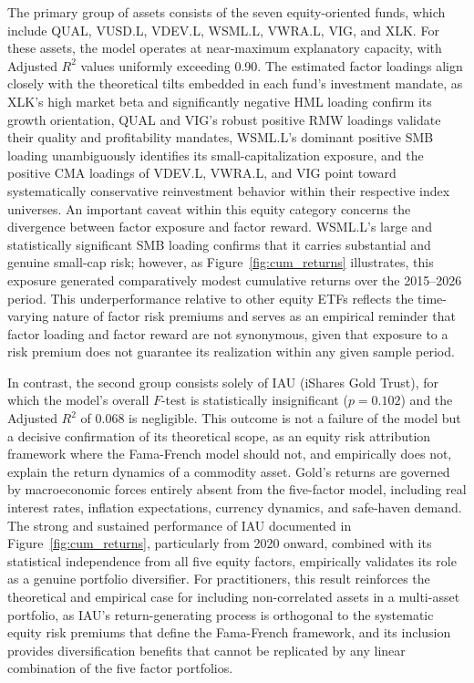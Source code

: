 \documentclass[12pt]{article}
\begin{document}
The primary group of assets consists of the seven equity-oriented funds, which include QUAL, VUSD.L, VDEV.L, WSML.L, VWRA.L, VIG, and XLK. For these assets, the model operates at near-maximum explanatory capacity, with Adjusted $R^2$ values uniformly exceeding 0.90. The estimated factor loadings align closely with the theoretical tilts embedded in each fund's investment mandate, as XLK's high market beta and significantly negative HML loading confirm its growth orientation, QUAL and VIG's robust positive RMW loadings validate their quality and profitability mandates, WSML.L's dominant positive SMB loading unambiguously identifies its small-capitalization exposure, and the positive CMA loadings of VDEV.L, VWRA.L, and VIG point toward systematically conservative reinvestment behavior within their respective index universes. An important caveat within this equity category concerns the divergence between factor exposure and factor reward. WSML.L's large and statistically significant SMB loading confirms that it carries substantial and genuine small-cap risk; however, as Figure~\ref{fig:cum_returns} illustrates, this exposure generated comparatively modest cumulative returns over the 2015--2026 period. This underperformance relative to other equity ETFs reflects the time-varying nature of factor risk premiums and serves as an empirical reminder that factor loading and factor reward are not synonymous, given that exposure to a risk premium does not guarantee its realization within any given sample period.

In contrast, the second group consists solely of IAU (iShares Gold Trust), for which the model's overall $F$-test is statistically insignificant ($p = 0.102$) and the Adjusted $R^2$ of 0.068 is negligible. This outcome is not a failure of the model but a decisive confirmation of its theoretical scope, as an equity risk attribution framework where the Fama-French model should not, and empirically does not, explain the return dynamics of a commodity asset. Gold's returns are governed by macroeconomic forces entirely absent from the five-factor model, including real interest rates, inflation expectations, currency dynamics, and safe-haven demand. The strong and sustained performance of IAU documented in Figure~\ref{fig:cum_returns}, particularly from 2020 onward, combined with its statistical independence from all five equity factors, empirically validates its role as a genuine portfolio diversifier. For practitioners, this result reinforces the theoretical and empirical case for including non-correlated assets in a multi-asset portfolio, as IAU's return-generating process is orthogonal to the systematic equity risk premiums that define the Fama-French framework, and its inclusion provides diversification benefits that cannot be replicated by any linear combination of the five factor portfolios.
\end{document}
